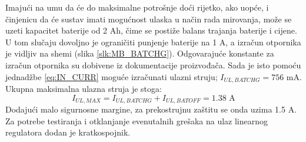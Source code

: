 Imajući na umu da će do maksimalne potrošnje doći rijetko, ako uopće, i činjenicu da će sustav imati mogućnost ulaska u način rada mirovanja, može se uzeti kapacitet baterije od 2 Ah, čime se postiže balans trajanja baterije i cijene. U tom slučaju dovoljno je ograničiti punjenje baterije na 1 A, a izračun otpornika je vidljiv na shemi (slika \ref{slk:MB_BATCHG}). Odgovarajuće konstante za izračun otpornika su dobivene iz dokumentacije proizvođača. Sada je isto pomoću jednadžbe \ref{eq:IN_CURR} moguće izračunati ulazni struju; ${I_{UL,BATCHG} = 756\textrm{ mA}}$. Ukupna maksimalna ulazna struja je stoga:
\begin{equation}
    I_{UL,MAX}=I_{UL,BATCHG}+I_{UL,BATOFF} = 1.38\textrm{ A}
    \label{eq:IN_CURR_MAX}
\end{equation}
Dodajući malo sigurnosne margine, za prekostrujnu zaštitu se onda uzima 1.5 A. Za potrebe testiranja i otklanjanje evenutalnih grešaka na ulaz linearnog regulatora dodan je kratkospojnik.

